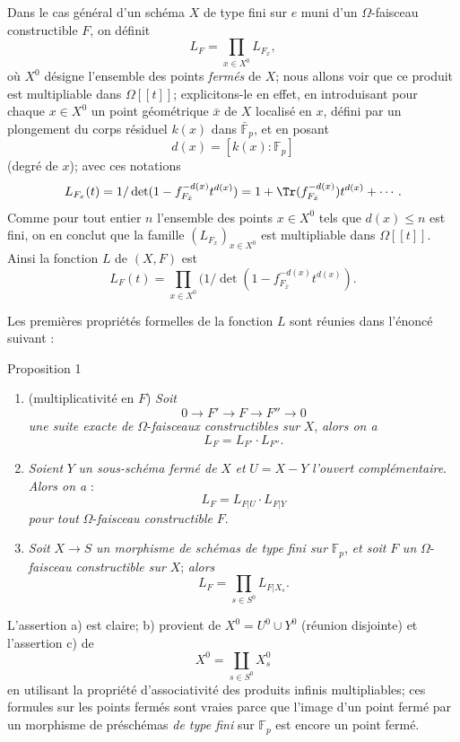 Dans le cas
général d'un schéma $X$ de type fini sur $e$ muni d'un $\Omega$-faisceau constructible $F$, on définit
\[
L_F=\prod_{x\in X^0}L_{F_x},
\]
où $X^0$ désigne l'ensemble des points \emph{fermés} de $X$; nous allons voir que ce produit est multipliable dans $\Omega[[t]]$; explicitons-le en effet, en introduisant pour chaque $x\in X^0$ un point géométrique $\bar x$ de $X$ localisé en $x$, défini par un plongement du corps résiduel $k(x)$ dans $\bar{\mathbb{F}}_p$, et en posant
\[
d(x)=[k(x):\mathbb{F}_p]
\]
(degré de $x$); avec ces notations
\[
L_{F_x}(t)=1/\det(1-f_{F_{\bar x}}^{-d(x)}t^{d(x)})
 =1+\Tr(f_{F_{\bar x}}^{-d(x)})t^{d(x)}+\cdots .
\]
Comme pour tout entier $n$ l'ensemble des points $x\in X^0$ tels que $d(x)\le n$ est fini, on en conclut que la famille $(L_{F_x})_{x\in X^0}$ est multipliable dans $\Omega[[t]]$. Ainsi la fonction $L$ de $(X,F)$ est
\[
L_F(t)=\prod_{x\in X^0}(1/\det(1-f_{F_{\bar x}}^{-d(x)}t^{d(x)}).
\]

Les premières propriétés formelles de la fonction $L$ sont réunies dans l'énoncé suivant :

\begin{statement}{Proposition 1}
\begin{enumerate}[label=\alph*)]
\item (multiplicativité en $F$) \emph{Soit}
\[
0\longrightarrow F'\longrightarrow F\longrightarrow F''\longrightarrow0
\]
\emph{une
suite exacte de} $\Omega$-\emph{faisceaux constructibles sur} $X$, \emph{alors on a}
\[
L_F=L_{F'}\cdot L_{F''}.
\]
\item \emph{Soient} $Y$ \emph{un sous-schéma fermé de} $X$ \emph{et} $U=X-Y$ \emph{l'ouvert complémentaire}. \emph{Alors on a} :
\[
L_F=L_{F|U}\cdot L_{F|Y}
\]
\emph{pour tout} $\Omega$-\emph{faisceau constructible} $F$.
\item \emph{Soit} $X\to S$ \emph{un morphisme de schémas de type fini sur} $\mathbb{F}_p$, \emph{et soit} $F$ \emph{un} $\Omega$-\emph{faisceau constructible sur} $X$; \emph{alors}
\[
L_F=\prod_{s\in S^0}L_{F|X_s}.
\]
\end{enumerate}
\end{statement}

L'assertion a) est claire; b) provient de $X^0=U^0\cup Y^0$ (réunion disjointe) et l'assertion c) de
\[
X^0=\coprod_{s\in S^0}X_s^0
\]
en utilisant la propriété d'associativité des produits infinis multipliables; ces formules sur les points fermés sont vraies parce que l'image d'un point fermé par un morphisme de préschémas \emph{de type fini} sur $\mathbb{F}_p$ est encore un point fermé.

